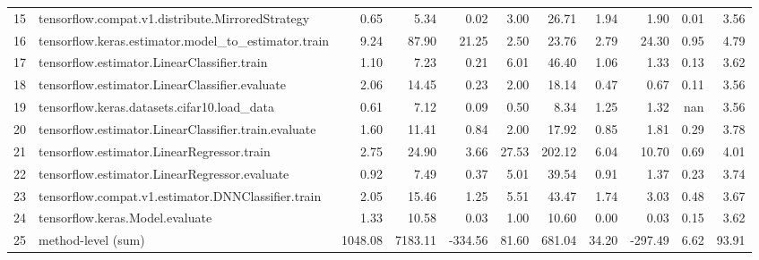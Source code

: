 \begin{tabular}{llrrrrrrrrr}
15 & tensorflow.compat.v1.distribute.MirroredStrategy & 0.65 & 5.34 & 0.02 & 3.00 & 26.71 & 1.94 & 1.90 & 0.01 & 3.56 \\
16 & tensorflow.keras.estimator.model_to_estimator.train & 9.24 & 87.90 & 21.25 & 2.50 & 23.76 & 2.79 & 24.30 & 0.95 & 4.79 \\
17 & tensorflow.estimator.LinearClassifier.train & 1.10 & 7.23 & 0.21 & 6.01 & 46.40 & 1.06 & 1.33 & 0.13 & 3.62 \\
18 & tensorflow.estimator.LinearClassifier.evaluate & 2.06 & 14.45 & 0.23 & 2.00 & 18.14 & 0.47 & 0.67 & 0.11 & 3.56 \\
19 & tensorflow.keras.datasets.cifar10.load_data & 0.61 & 7.12 & 0.09 & 0.50 & 8.34 & 1.25 & 1.32 & nan & 3.56 \\
20 & tensorflow.estimator.LinearClassifier.train.evaluate & 1.60 & 11.41 & 0.84 & 2.00 & 17.92 & 0.85 & 1.81 & 0.29 & 3.78 \\
21 & tensorflow.estimator.LinearRegressor.train & 2.75 & 24.90 & 3.66 & 27.53 & 202.12 & 6.04 & 10.70 & 0.69 & 4.01 \\
22 & tensorflow.estimator.LinearRegressor.evaluate & 0.92 & 7.49 & 0.37 & 5.01 & 39.54 & 0.91 & 1.37 & 0.23 & 3.74 \\
23 & tensorflow.compat.v1.estimator.DNNClassifier.train & 2.05 & 15.46 & 1.25 & 5.51 & 43.47 & 1.74 & 3.03 & 0.48 & 3.67 \\
24 & tensorflow.keras.Model.evaluate & 1.33 & 10.58 & 0.03 & 1.00 & 10.60 & 0.00 & 0.03 & 0.15 & 3.62 \\
25 & method-level (sum) & 1048.08 & 7183.11 & -334.56 & 81.60 & 681.04 & 34.20 & -297.49 & 6.62 & 93.91 \\
\end{tabular}
